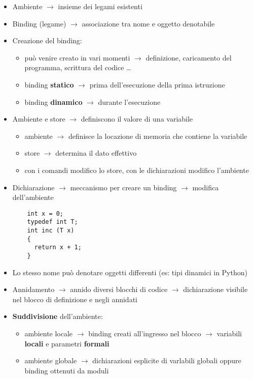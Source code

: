 \documentclass{article}
\begin{document}
\begin{itemize}
  \item Ambiente $\rightarrow$ insieme dei legami esistenti
  \item Binding (legame) $\rightarrow$ associazione tra nome e oggetto denotabile
  \item Creazione del binding:
  \begin{itemize}
    \item può venire creato in vari momenti $\rightarrow$ definizione, caricamento del programma, scrittura del codice \dots
    \item binding \textbf{statico} $\rightarrow$ prima dell'esecuzione della prima istruzione
    \item binding \textbf{dinamico} $\rightarrow$ durante l'esecuzione
  \end{itemize}
  \item Ambiente e store $\rightarrow$ definiscono il valore di una variabile
  \begin{itemize}
    \item ambiente $\rightarrow$ definisce la locazione di memoria che contiene la variabile
    \item store $\rightarrow$ determina il dato effettivo
    \item con i comandi modifico lo store, con le dichiarazioni modifico l'ambiente
  \end{itemize}
  \item Dichiarazione $\rightarrow$ meccanismo per creare un binding $\rightarrow$ modifica dell'ambiente
  \begin{lstlisting}
    int x = 0;
    typedef int T;
    int inc (T x) 
    {
      return x + 1;
    }
  \end{lstlisting}
  \item Lo stesso nome può denotare oggetti differenti (es: tipi dinamici in Python)
  \item Annidamento $\rightarrow$ annido diversi blocchi di codice $\rightarrow$ dichiarazione visibile nel blocco di definizione e negli annidati
  \item \textbf{Suddivisione} dell'ambiente:
  \begin{itemize}
    \item ambiente locale $\rightarrow$ binding creati all'ingresso nel blocco $\rightarrow$ variabili \textbf{locali} e parametri \textbf{formali}
    \item ambiente globale $\rightarrow$ dichiarazioni esplicite di varlabili globali oppure binding ottenuti da moduli
  \end{itemize} 


\end{itemize}
\end{document}
